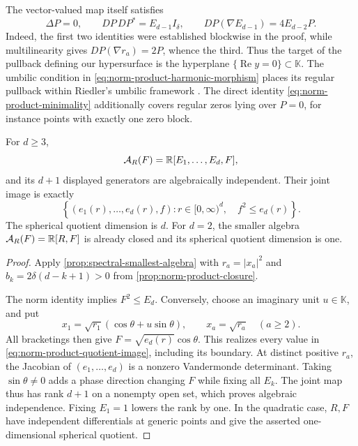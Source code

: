 The vector-valued map itself satisfies
\begin{equation}\label{eq:norm-product-harmonic-morphism}
 \Delta P=0,\qquad DP\,DP^*=E_{d-1}I_{\delta},\qquad
 DP(\nabla E_{d-1})=4E_{d-2}P.
\end{equation}
Indeed, the first two identities were established blockwise in the
proof, while multilinearity gives \(DP(\nabla r_a)=2P\), whence
the third.  Thus the target of the pullback defining our hypersurface
is the hyperplane \(\{\operatorname{Re}y=0\}\subset\mathbb K\).
The umbilic condition in \eqref{eq:norm-product-harmonic-morphism}
places its regular pullback within Riedler's umbilic framework
\cite[Theorem~5.1.4]{RiedlerThesis25}.  The direct identity
\eqref{eq:norm-product-minimality} additionally covers regular zeros
lying over \(P=0\), for instance points with exactly one zero block.

\begin{proposition}
\label{prop:norm-product-exact-algebra}
For \(d\ge3\),
\begin{equation}\label{eq:norm-product-smallest-algebra}
 \mathcal A_R(F)=\mathbb R[E_1,\ldots,E_d,F],
\end{equation}
and its \(d+1\) displayed generators are algebraically independent.
Their joint image is exactly
\begin{equation}\label{eq:norm-product-quotient-image}
 \left\{(e_1(r),\ldots,e_d(r),f):
             r\in[0,\infty)^d,\quad f^2\le e_d(r)\right\}.
\end{equation}
The spherical quotient dimension is \(d\).
For \(d=2\), the smaller algebra \(\mathcal A_R(F)=\mathbb R[R,F]\) is already
closed and its spherical quotient dimension is one.
\end{proposition}

\begin{proof}
Apply \cref{prop:spectral-smallest-algebra} with
\(r_a=|x_a|^2\) and \(b_k=2\delta(d-k+1)>0\) from
\cref{prop:norm-product-closure}.

The norm identity implies \(F^2\le E_d\).
Conversely, choose an imaginary unit \(u\in\mathbb K\), and put
\[
 x_1=\sqrt{r_1}(\cos\theta+u\sin\theta),\qquad
 x_a=\sqrt{r_a}\quad(a\ge2).
\]
All bracketings then give \(F=\sqrt{e_d(r)}\cos\theta\).
This realizes every value in \eqref{eq:norm-product-quotient-image},
including its boundary.
At distinct positive \(r_a\), the Jacobian of
\((e_1,\ldots,e_d)\) is a nonzero Vandermonde determinant.
Taking \(\sin\theta\ne0\) adds a phase direction changing \(F\)
while fixing all \(E_k\).  The joint map thus has rank \(d+1\)
on a nonempty open set, which proves algebraic independence.
Fixing \(E_1=1\) lowers the rank by one.  In the quadratic case,
\(R,F\) have independent differentials at generic points and
give the asserted one-dimensional spherical quotient.
\end{proof}

